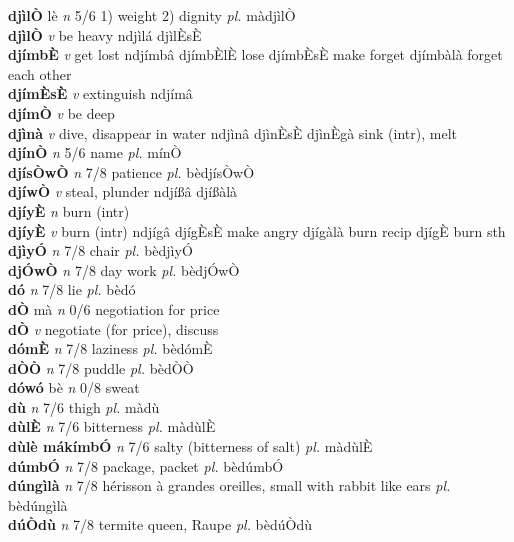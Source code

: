 \documentclass{article}
\newlength\cus
\begin{document}
{\bf djìlÒ} lè {\it n} 5/6 1) weight 2) dignity {\it pl.} màdjìlÒ         \\ 
{\bf djìlÒ}  {\it v} be heavy   ndjìlá  djìlÈsÈ    \\ 
{\bf djímbÈ}  {\it v} get lost   ndjímbâ djímbÈlÈ lose djímbÈsÈ make forget djímbàlà forget each other   \\ 
{\bf djímÈsÈ}  {\it v} extinguish   ndjímâ      \\ 
{\bf djímÒ}  {\it v} be deep         \\ 
{\bf djìnà}  {\it v} dive, disappear in water   ndjìnâ  djìnÈsÈ  djìnÈgà sink (intr), melt  \\ 
{\bf djínÒ}  {\it n} 5/6 name {\it pl.} mínÒ         \\ 
{\bf djísÒwÒ}  {\it n} 7/8 patience {\it pl.} bèdjísÒwÒ         \\ 
{\bf djíwÒ}  {\it v} steal, plunder   ndjíßâ   djíßàlà   \\ 
{\bf djíyÈ}  {\it n} burn (intr)         \\ 
{\bf djíyÈ}  {\it v} burn (intr)   ndjígâ  djígÈsÈ make angry djígàlà burn recip  djígÈ burn sth \\ 
{\bf djìyÓ}  {\it n} 7/8 chair {\it pl.} bèdjìyÓ         \\ 
{\bf djÓwÒ}  {\it n} 7/8 day work {\it pl.} bèdjÓwÒ         \\ 
{\bf dó}  {\it n} 7/8 lie {\it pl.} bèdó         \\ 
{\bf dÒ} mà {\it n} 0/6 negotiation for price         \\ 
{\bf dÒ}  {\it v} negotiate (for price), discuss         \\ 
{\bf dómÈ}  {\it n} 7/8 laziness {\it pl.} bèdómÈ         \\ 
{\bf dÒÒ}  {\it n} 7/8 puddle {\it pl.} bèdÒÒ         \\ 
{\bf dówó} bè {\it n} 0/8 sweat         \\ 
{\bf dù}  {\it n} 7/6 thigh {\it pl.} màdù         \\ 
{\bf dùlÈ}  {\it n} 7/6 bitterness {\it pl.} màdùlÈ         \\ 
{\bf dùlè mákímbÓ}  {\it n} 7/6 salty (bitterness of salt) {\it pl.} màdùlÈ         \\ 
{\bf dúmbÓ}  {\it n} 7/8 package, packet {\it pl.} bèdúmbÓ         \\ 
{\bf dúngìlà}  {\it n} 7/8 hérisson à grandes oreilles, small with rabbit like ears {\it pl.} bèdúngìlà         \\ 
{\bf dúÒdù}  {\it n} 7/8 termite queen, Raupe {\it pl.} bèdúÒdù         \\ 
\end{document}
